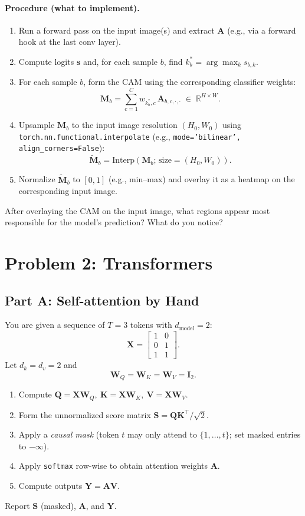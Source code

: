 \documentclass{article}
\begin{document}
\paragraph{Procedure (what to implement).}
\begin{enumerate}
  \item Run a forward pass on the input image(s) and extract $\mathbf{A}$ (e.g., via a forward hook at the last conv layer).
  \item Compute logits $\mathbf{s}$ and, for each sample $b$, find $k_b^\ast=\arg\max_k s_{b,k}$.
  \item For each sample $b$, form the CAM using the corresponding classifier weights:
  \[
  \mathbf{M}_{b} = \sum_{c=1}^{C} w_{k_b^\ast,c}\,\mathbf{A}_{b,c,\cdot,\cdot}\;\in\;\mathbb{R}^{H\times W}.
  \]
  \item Upsample $\mathbf{M}_{b}$ to the input image resolution $(H_0,W_0)$ using \texttt{torch.nn.functional.interpolate} (e.g., \texttt{mode='bilinear', align\_corners=False}):
  \[
  \tilde{\mathbf{M}}_{b}=\mathrm{Interp}\!\left(\mathbf{M}_{b};\,\text{size}=(H_0,W_0)\right).
  \]
  \item Normalize $\tilde{\mathbf{M}}_{b}$ to $[0,1]$ (e.g., min--max) and overlay it as a heatmap on the corresponding input image.
\end{enumerate}


After overlaying the CAM on the input image, what regions appear most responsible for the model's prediction? What do you notice?

%

\newpage
\section*{Problem 2: Transformers}

\subsection*{Part A: Self-attention by Hand}
You are given a sequence of $T=3$ tokens with $d_{\text{model}}=2$:
\[
\mathbf{X}=
\begin{bmatrix}
1 & 0\\
0 & 1\\
1 & 1
\end{bmatrix}.
\]
Let $d_k=d_v=2$ and
\[
\mathbf{W}_Q=\mathbf{W}_K=\mathbf{W}_V=\mathbf{I}_2.
\]
\begin{enumerate}
  \item Compute $\mathbf{Q}=\mathbf{X}\mathbf{W}_Q,\ \mathbf{K}=\mathbf{X}\mathbf{W}_K,\ \mathbf{V}=\mathbf{X}\mathbf{W}_V$.
  \item Form the unnormalized score matrix $\mathbf{S}=\mathbf{Q}\mathbf{K}^\top/\sqrt{2}$.
  \item Apply a \emph{causal mask} (token $t$ may only attend to $\{1,\dots,t\}$; set masked entries to $-\infty$).
  \item Apply \texttt{softmax} row-wise to obtain attention weights $\mathbf{A}$.
  \item Compute outputs $\mathbf{Y}=\mathbf{A}\mathbf{V}$.
\end{enumerate}
Report $\mathbf{S}$ (masked), $\mathbf{A}$, and $\mathbf{Y}$.
\end{document}
